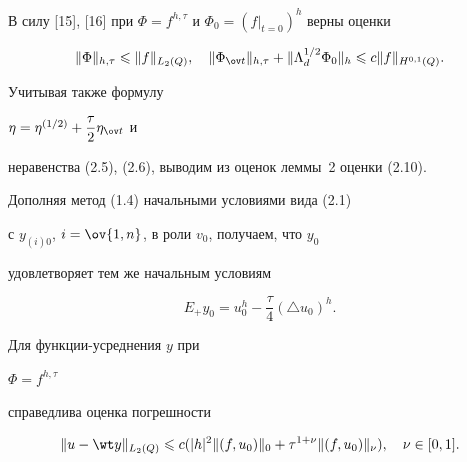 \begin{pf}


В силу [15], [16] при $\Phi=f^{h,\tau}$ и $\Phi_0=(f|_{t=0})^h$ верны оценки


$$


\|\Phi\|_{h,\tau}\lee\|f\|_{L_2(Q)},\quad


\|\Phi_{\ov t}\|_{h,\tau}+\|\Lambda_d^{1/2}\Phi_0\|_{h}\lee c


\|f\|_{H^{0,1}(Q)}.


$$


Учитывая также формулу


$\eta=\eta^{(1/2)}+\dfrac{\tau}{2}\eta_{\ov t}$ и


неравенства (2.5), (2.6), выводим из оценок леммы~2 оценки (2.10).


\end{pf}





Дополняя метод (1.4) начальными условиями вида (2.1) 


с $y_{(i)0}$, $i=\ov{1,n}$, в роли $v_0$, получаем, что $y_0$ 


удовлетворяет тем же начальным условиям


\begin{equation}


E_+y_0=


u_0^h-\dfrac{\tau}{4}(\triangle u_0)^h.


\end{equation}





\begin{thm} Для функции-усреднения $y$ при


$\Phi=f^{h,\tau}$


справедлива оценка погрешности


\begin{equation}


\|u-\wt y\|_{L_2(Q)}\lee c(|h|^2\|(f,u_0)\|_0+


\tau^{1+\nu}\|(f,u_0)\|_\nu),\quad \nu\in [0,1].


\end{equation}


\end{thm}






